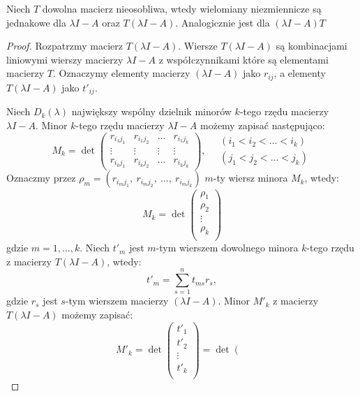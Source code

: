 \begin{lemma}\label{lemma:jordan_1}
    Niech $T$ dowolna macierz nieosobliwa, wtedy wielomiany niezmiennicze są jednakowe dla $\lambda I - A$ oraz $T(\lambda I - A)$. Analogicznie jest dla $(\lambda I - A)T$
\end{lemma}
\begin{proof}
Rozpatrzmy macierz $T(\lambda I - A)$. Wiersze $T(\lambda I - A)$ są kombinacjami liniowymi wierszy macierzy $\lambda I - A$ z współczynnikami które są elementami macierzy $T$. Oznaczymy elementy macierzy $(\lambda I - A)$ jako $r_{ij}$, a elementy $T(\lambda I - A)$ jako $t'_{ij}$. 

Niech $D_k(\lambda)$ największy wspólny dzielnik minorów $k$-tego rzędu macierzy $\lambda I - A$. Minor $k$-tego rzędu macierzy $\lambda I - A$ możemy zapisać następująco:
$$ M_k = \det\left(\begin{matrix}
    r_{i_1j_1} & r_{i_1j_2} & \dots  & r_{i_1j_k} \\
    \vdots & \vdots &  \vdots & \vdots \\
    r_{i_kj_1} & r_{i_kj_2} & \dots & r_{i_kj_k}
\end{matrix}\right), \quad 
\begin{matrix}
    (i_1 < i_2 < \ldots < i_k) \\
    (j_1 < j_2 < \ldots < j_k)
\end{matrix}$$
Oznaczmy przez $\rho_m = (r_{i_mj_1}, \ r_{i_mj_2}, \ \ldots, \ r_{i_mj_k})$ $m$-ty  wiersz minora $M_k$, wtedy:
$$M_k = \det\left(\begin{matrix}
    \rho_1  \\
    \rho_2  \\
    \vdots \\
    \rho_k \\
\end{matrix}\right)$$
gdzie $m = 1, \ldots, k$. Niech $t'_m$ jest $m$-tym wierszem dowolnego minora $k$-tego rzędu z macierzy $T(\lambda I - A)$, wtedy:
$$t'_m = \sum_{s=1}^{n}{t_{ms}r_s},$$
gdzie $r_s$ jest $s$-tym wierszem macierzy $(\lambda I - A)$.
Minor $M'_k$ z macierzy $T(\lambda I - A)$ możemy zapisać:
$$M'_k = \det\left(\begin{matrix}
    t'_1  \\
    t'_2  \\
    \vdots \\
    t'_k \\
\end{matrix}\right) = \det\left(\begin{matrix}

\end{matrix}$$
\end{proof}
